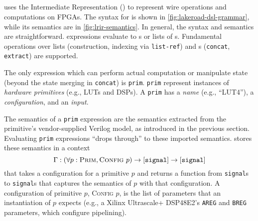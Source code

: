 \subsection{\lrir}
\label{subsec:spec-ir-and-lrir}






\lr uses the \lr Intermediate Representation (\lrir) to represent
  wire operations and computations on FPGAs.
The syntax for \lrir is shown in
  \cref{fig:lakeroad-dsl-grammar},
  while its semantics are in \cref{fig:lrir-semantics}.
In general, the \lrir syntax and semantics 
  are straightforward.
\lrir expressions evaluate to \signal{}s or
  lists of \signal{}s.
Fundamental operations over lists
  (construction, 
  indexing via \texttt{list-ref})
  and \signal{}s
  (\texttt{concat}, \texttt{extract}) 
  are supported.

The only \lrir expression
  which can perform actual computation
  or manipulate state
  (beyond the state merging in \texttt{concat})
  is \texttt{prim}.
\texttt{prim}
  represent instances
  of \textit{hardware primitives} (e.g., LUTs and DSPs).
A \texttt{prim} has a \textit{name}
  (e.g., ``LUT4''), a \textit{configuration},
  and an \textit{input}.

The semantics of a \texttt{prim} expression
  are the semantics extracted from the
  primitive's vendor-supplied Verilog model,
  as introduced in the previous section.
Evaluating \texttt{prim} expressions
  ``drops through'' to these imported
  semantics.
\lrir stores these semantics in
  a context 
  \[\Gamma: \left(\forall p: \textsc{Prim},
            \textsc{Config}\ p\right)
            \rightarrow [\texttt{signal}] 
            \rightarrow [\texttt{signal}]\]
  that takes a configuration
  for a primitive $p$
  and returns a function from
  \texttt{signal}s to \texttt{signal}s
  that captures the semantics
  of $p$ with that configuration.
A configuration of primitive $p$,
  \textsc{Config} $p$,
  is the list of parameters that
  an instantiation of $p$ expects
  (e.g., a Xilinx Ultrascale+ DSP48E2's
  \texttt{AREG}
  and \texttt{BREG}
  parameters, which configure pipelining).
  

